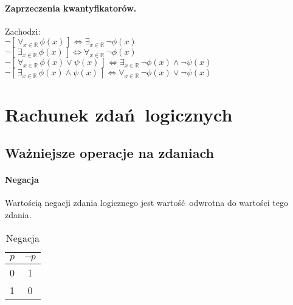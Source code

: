 \documentclass{article}
\begin{document}
    \paragraph{Zaprzeczenia kwantyfikatorów.} Zachodzi:\\
    $\neg [\,\forall_{x \in \mathbb{R}} \, \phi(x)\,] \Leftrightarrow \exists_{x \in \mathbb{R}} \, \neg \phi(x)$\\
    $\neg [\,\exists_{x \in \mathbb{R}} \, \phi(x)\,] \Leftrightarrow \forall_{x \in \mathbb{R}} \, \neg \phi(x)$\\
    $\neg [\,\forall_{x \in \mathbb{R}} \, \phi(x) \vee \psi(x)\,] \Leftrightarrow \exists_{x \in \mathbb{R}} \, \neg \phi(x) \wedge \neg \psi(x)$\\
    $\neg [\,\exists_{x \in \mathbb{R}} \, \phi(x) \wedge \psi(x)\,] \Leftrightarrow \forall_{x \in \mathbb{R}} \, \neg \phi(x) \vee \neg \psi(x)$
    \newpage

    \section{Rachunek zdań logicznych}
    \subsection{Ważniejsze operacje na zdaniach}
    \paragraph{Negacja}
    Wartością negacji zdania logicznego jest wartość odwrotna do wartości tego zdania.
    \begin{table}[h!]
        \begin{center}
            \caption{Negacja}
            \label{tab:tabela1}
            \begin{tabular}{c|c}
                \textbf{$p$} & \textbf{$\neg p$} \\
                \midrule
                0 & 1\\
                1 & 0 \\
                \bottomrule
            \end{tabular}
        \end{center}
    \end{table}
\end{document}
